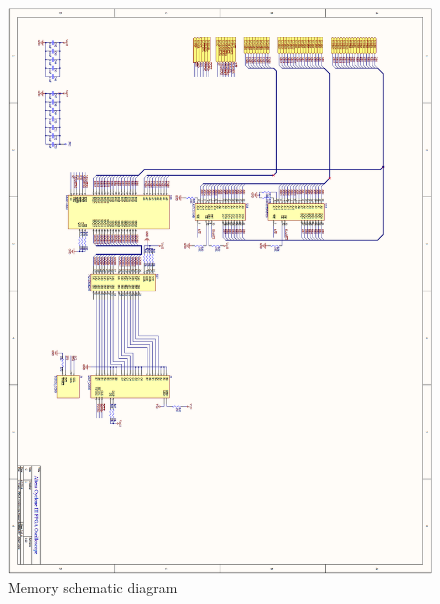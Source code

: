 \begin{appendices}
\begin{figure}[ht!]
    \centering
    \includegraphics[width=6in]{circuit/memory_page.png}
		\caption{Memory schematic diagram}
\end{figure}


\end{appendices}
